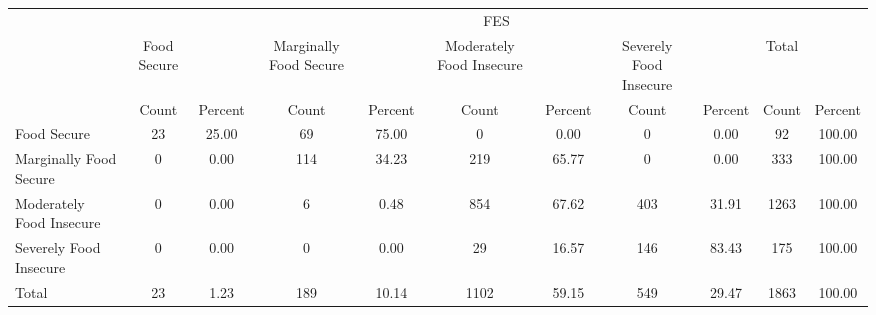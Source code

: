 {
\def\sym#1{\ifmmode^{#1}\else\(^{#1}\)\fi}
\begin{tabular}{l*{5}{cc}}
\hline\hline
            &\multicolumn{10}{c}{FES}                                                                                                         \\
            & Food Secure&            &Marginally Food Secure&            &Moderately Food Insecure&            &Severely Food Insecure&            &       Total&            \\
            &       Count&     Percent&       Count&     Percent&       Count&     Percent&       Count&     Percent&       Count&     Percent\\
\hline
Food Secure &          23&       25.00&          69&       75.00&           0&        0.00&           0&        0.00&          92&      100.00\\
Marginally Food Secure&           0&        0.00&         114&       34.23&         219&       65.77&           0&        0.00&         333&      100.00\\
Moderately Food Insecure&           0&        0.00&           6&        0.48&         854&       67.62&         403&       31.91&        1263&      100.00\\
Severely Food Insecure&           0&        0.00&           0&        0.00&          29&       16.57&         146&       83.43&         175&      100.00\\
Total       &          23&        1.23&         189&       10.14&        1102&       59.15&         549&       29.47&        1863&      100.00\\
\hline\hline
\end{tabular}
}
